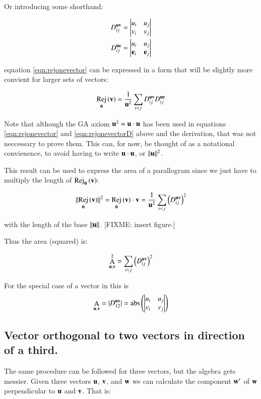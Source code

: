 \documentclass{article}      %
\DeclareMathOperator{\AbsName}{abs}
\DeclareMathOperator{\RejName}{Rej}
\newcommand{\Rej}[2]{\RejName_{#1}\left( {#2} \right)}
\DeclareMathOperator{\AName}{A}
\newcommand{\AreaOp}[1]{\AName_{#1}}
\begin{document}
Or introducing some shorthand:

\begin{align*}
D_{ij}^{\mathbf{u} \mathbf{v}} &= \begin{vmatrix} {u}_{i} & {u}_{j} \\ {v}_{i} & {v}_{j} \end{vmatrix} \\
D_{ij}^{\mathbf{u} \mathbf{e}} &= \begin{vmatrix} {u}_{i} & {u}_{j} \\ {\mathbf{e}}_{i} & {\mathbf{e}}_{j} \end{vmatrix} \\
\end{align*}

equation \ref{eqn:rejonevector} can be expressed in a form that will be slightly more convient for larger sets of
vectors:

\begin{equation}\label{eqn:rejonevectorD}
\Rej{\ucap}{\Bv} = \inv{\Bu^2}\sum_{i<j} D_{ij}^{\Bu \Bv} D_{ij}^{\Bu \Be}
\end{equation}

Note that although the GA axiom $\mathbf{u}^2 = \mathbf{u} \cdot \mathbf{u}$ has been used
in equations \ref{eqn:rejonevector} and \ref{eqn:rejonevectorD} above and the derivation, that was
not neccessary to prove them.
This can, for now, be thought of as a notational convienence, to avoid having to write $\mathbf{u} \cdot \mathbf{u}$, or
$\lVert{\mathbf{u}}\rVert^2$.

This result can be used to express the  area of a parallogram since we just have to multiply the length
of $\Rej{\ucap}{\Bv}$:

\[
\norm{\Rej{\ucap}{\Bv}}^2 = 
\Rej{\ucap}{\Bv} \cdot \Bv =
\inv{\Bu^2}\sum_{i<j} {\left(D_{ij}^{\Bu \Bv}\right)}^2
\]

with the length of the base $\lVert{\mathbf{u}}\rVert$. [FIXME: insert figure.]

Thus the area (squared) is:

\begin{equation}\label{eqn:parallogramarea}
\AreaOp{\Bu,\Bv}^2 = \sum_{i<j} {\left(D_{ij}^{\Bu \Bv}\right)}^2
\end{equation}

For the special case of a vector in  this is
\begin{equation}\label{eqn:parallogramarear2}
\AreaOp{\Bu,\Bv} = \abs{D_{12}^{\Bu \Bv}} = \AbsName\left(\DETuvij{u}{v}{i}{j}\right)
\end{equation}

\subsection{ Vector orthogonal to two vectors in direction of a third. }

The same procedure can be followed for three vectors, but the algebra gets messier.  Given three vectors $\mathbf{u}$, $\mathbf{v}$, and $\mathbf{w}$
we can calculate the component $\mathbf{w}'$ of $\mathbf{w}$ perpendicular to $\mathbf{u}$ and $\mathbf{v}$.  That is:
\end{document}
